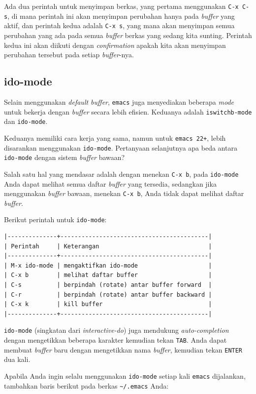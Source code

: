 \documentclass{article}
\begin{document}
Ada dua perintah untuk menyimpan berkas, yang pertama menggunakan
\verb=C-x C-s=, di mana perintah ini akan menyimpan perubahan hanya pada 
\emph{buffer} yang aktif, dan perintah kedua adalah \verb=C-x s=, yang mana 
akan menyimpan semua perubahan yang ada pada semua \emph{buffer} berkas
yang sedang kita sunting. Perintah kedua ini akan diikuti dengan
\emph{confirmation} apakah kita akan menyimpan perubahan tersebut pada setiap 
\emph{buffer}-nya.

\subsection{ido-mode}
Selain menggunakan \emph{default buffer}, \verb=emacs= juga menyediakan beberapa
\emph{mode} untuk bekerja dengan \emph{buffer} secara lebih efisien. Keduanya 
adalah \verb=iswitchb-mode= dan \verb=ido-mode=.

Keduanya memiliki cara kerja yang sama, namun untuk \verb=emacs 22+=, lebih 
disarankan menggunakan \verb=ido-mode=. Pertanyaan selanjutnya apa beda 
antara \verb=ido-mode= dengan sistem \emph{buffer} bawaan?

Salah satu hal yang mendasar adalah dengan menekan \verb=C-x b=, pada 
\verb=ido-mode= Anda dapat melihat semua daftar \emph{buffer} yang tersedia,
sedangkan jika menggunakan \emph{buffer} bawaan, menekan \verb=C-x b=, Anda 
tidak dapat melihat daftar \emph{buffer}.

Berikut perintah untuk \verb=ido-mode=:

\begin{verbatim}
|--------------+------------------------------------------|
| Perintah     | Keterangan                               |
|--------------+------------------------------------------|
| M-x ido-mode | mengaktifkan ido-mode                    |
| C-x b        | melihat daftar buffer                    |
| C-s          | berpindah (rotate) antar buffer forward  |
| C-r          | berpindah (rotate) antar buffer backward |
| C-x k        | kill buffer                              |
|--------------+------------------------------------------|
\end{verbatim}

\verb=ido-mode= (singkatan dari \emph{interactive-do}) juga mendukung 
\emph{auto-completion} dengan mengetikkan beberapa karakter kemudian tekan 
\verb=TAB=. Anda dapat membuat \emph{buffer} baru dengan mengetikkan 
nama \emph{buffer}, kemudian tekan \verb=ENTER= dua kali.

Apabila Anda ingin selalu menggunakan \verb=ido-mode= setiap kali \verb=emacs= 
dijalankan, tambahkan baris berikut pada berkas \verb=~/.emacs= Anda:
\end{document}

